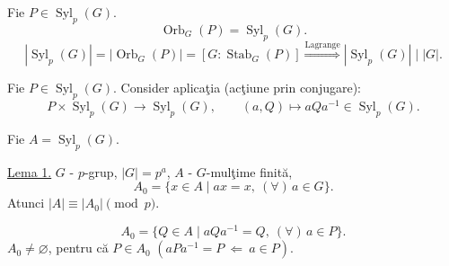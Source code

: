 \bigskip
\noindent{}\quad
Fie $P\in\operatorname{Syl}_p(G)$.
\[
\operatorname{Orb}_G(P)=\operatorname{Syl}_p(G).
\]
\[
|\operatorname{Syl}_p(G)|=|\operatorname{Orb}_G(P)|
=[G:\operatorname{Stab}_G(P)]
\overset{\text{Lagrange}}{\Longrightarrow}
|\operatorname{Syl}_p(G)|\mid|G|.
\]

\medskip
\noindent Fie $P\in\operatorname{Syl}_p(G)$. Consider aplicaţia
(acţiune prin conjugare):
\[
P\times\operatorname{Syl}_p(G)\longrightarrow\operatorname{Syl}_p(G),
\qquad (a,Q)\longmapsto aQa^{-1}\in\operatorname{Syl}_p(G).
\]

\noindent Fie $A=\operatorname{Syl}_p(G)$.

\medskip
\noindent\underline{Lema 1.}\quad
$G$ - $p$-grup, $|G|=p^a$, $A$ - $G$-mulţime finită,
\[
A_0=\{x\in A\mid ax=x,\ (\forall)\,a\in G\}.
\]
\noindent Atunci $|A|\equiv|A_0|\pmod p$.

\medskip
\noindent
\[
A_0=\{Q\in A\mid aQa^{-1}=Q,\ (\forall)\,a\in P\}.
\]
\noindent $A_0\neq\varnothing$, pentru că $P\in A_0$
$(aPa^{-1}=P\ \Longleftarrow\ a\in P)$.

